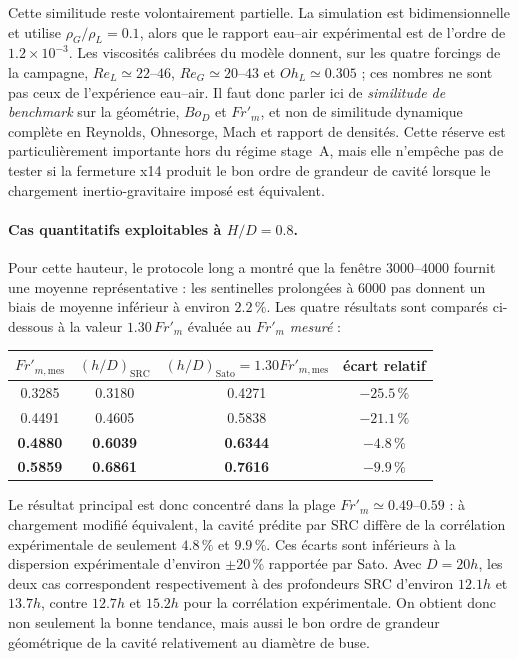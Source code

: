 \documentclass[11pt,a4paper]{article}
\begin{document}
Cette similitude reste volontairement partielle. La simulation est bidimensionnelle et utilise $\rho_G/\rho_L=0.1$, alors que le rapport eau--air expérimental est de l'ordre de $1.2\times10^{-3}$. Les viscosités calibrées du modèle donnent, sur les quatre forcings de la campagne, $Re_L\simeq22$--$46$, $Re_G\simeq20$--$43$ et $Oh_L\simeq0.305$ ; ces nombres ne sont pas ceux de l'expérience eau--air. Il faut donc parler ici de \emph{similitude de benchmark} sur la géométrie, $Bo_D$ et $Fr'_m$, et non de similitude dynamique complète en Reynolds, Ohnesorge, Mach et rapport de densités. Cette réserve est particulièrement importante hors du régime stage~A, mais elle n'empêche pas de tester si la fermeture x14 produit le bon ordre de grandeur de cavité lorsque le chargement inertio-gravitaire imposé est équivalent.

\paragraph{Cas quantitatifs exploitables à $H/D=0.8$.}
Pour cette hauteur, le protocole long a montré que la fenêtre $3000$--$4000$ fournit une moyenne représentative : les sentinelles prolongées à 6000 pas donnent un biais de moyenne inférieur à environ $2.2\,\%$. Les quatre résultats sont comparés ci-dessous à la valeur $1.30\,Fr'_m$ évaluée au $Fr'_m$ \emph{mesuré} :
\begin{center}
\small
\begin{tabular}{cccc}
\toprule
$Fr'_{m,\mathrm{mes}}$ & $(h/D)_{\mathrm{SRC}}$ & $(h/D)_{\mathrm{Sato}}=1.30Fr'_{m,\mathrm{mes}}$ & écart relatif \\
\midrule
0.3285 & 0.3180 & 0.4271 & $-25.5\,\%$ \\
0.4491 & 0.4605 & 0.5838 & $-21.1\,\%$ \\
\textbf{0.4880} & \textbf{0.6039} & \textbf{0.6344} & \textbf{$-4.8\,\%$} \\
\textbf{0.5859} & \textbf{0.6861} & \textbf{0.7616} & \textbf{$-9.9\,\%$} \\
\bottomrule
\end{tabular}
\end{center}
Le résultat principal est donc concentré dans la plage $Fr'_m\simeq0.49$--$0.59$ : à chargement modifié équivalent, la cavité prédite par SRC diffère de la corrélation expérimentale de seulement $4.8\,\%$ et $9.9\,\%$. Ces écarts sont inférieurs à la dispersion expérimentale d'environ $\pm20\,\%$ rapportée par Sato. Avec $D=20h$, les deux cas correspondent respectivement à des profondeurs SRC d'environ $12.1h$ et $13.7h$, contre $12.7h$ et $15.2h$ pour la corrélation expérimentale. On obtient donc non seulement la bonne tendance, mais aussi le bon ordre de grandeur géométrique de la cavité relativement au diamètre de buse.
\end{document}

